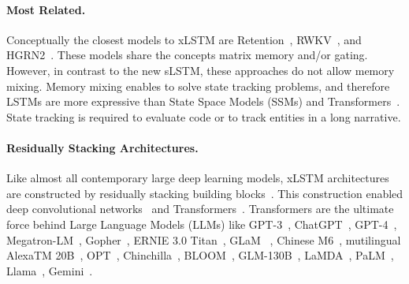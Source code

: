 \documentclass[dvipsnames]{article}
\begin{document}
\paragraph{Most Related.}
Conceptually the closest models to xLSTM are Retention~\citep{Sun:23arxiv},
RWKV~\citep{Peng:23arxivshort,Peng:24arxivshort},
and HGRN2~\citep{Qin:24arxiv}.
These models share the concepts matrix memory and/or gating.
However, in contrast to the new sLSTM, these approaches do not allow memory mixing.
Memory mixing enables to solve state tracking problems,
and therefore LSTMs are more expressive
than State Space Models (SSMs) and Transformers~\citep{Merrill:24,Deletang:23}.
State tracking is required to evaluate code or
to track entities in a long narrative.
\paragraph{Residually Stacking Architectures.}
Like almost all contemporary large deep learning models,
xLSTM architectures are constructed
by residually stacking building blocks~\citep{Srivastava:15,He:16}.
This construction enabled
deep convolutional networks~\citep{He:16} and
Transformers~\citep{Vaswani:17}.
Transformers are the ultimate force behind
Large Language Models (LLMs) like
GPT-3~\citep{Brown:20short},
ChatGPT~\citep{Schulman:22short},
GPT-4~\citep{Achiam:23gpt4short},
Megatron-LM~\citep{Shoeybi:19},
Gopher~\citep{Rae:21short},
ERNIE 3.0 Titan~\citep{Wang:21arxivshort},
GLaM ~\citep{Du:21glamshort},
Chinese M6~\citep{Lin:21},
mutilingual AlexaTM 20B~\citep{Soltan:22},
OPT~\citep{Zhang:22opt},
Chinchilla~\citep{Hoffmann:22short},
BLOOM~\citep{Scao:22arxivshort},
GLM-130B~\citep{Zeng:22arxivshort},
LaMDA~\citep{Thoppilan:22short},
PaLM~\citep{Chowdhery:22short},
Llama~\citep{Touvron:23arxiv},
Gemini~\citep{GeminiTeam:23arxiv,Reid:24arxiv}.
\end{document}

